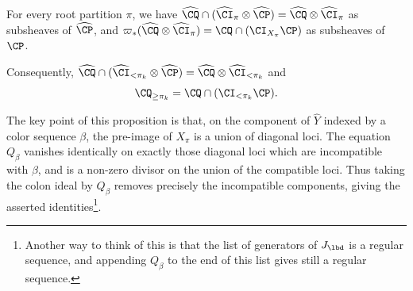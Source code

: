 \documentclass[11pt,reqno]{amsart}
\begin{document}
\begin{proposition}\label{prop:Q as cap}
For every root partition $\pi$, we have $\widehat{\CQ}\cap(\widehat{\CI}_\pi\otimes\widehat{\CP})=\widehat{\CQ}\otimes\widehat{\CI}_\pi$ as subsheaves of $\widehat{\CP}$, and $\varpi_*(\widehat{\CQ}\otimes\widehat{\CI}_\pi)=\CQ\cap(\CI_{X_\pi}\CP)$ as subsheaves of $\CP$. 

Consequently, $\widehat{\CQ}\cap(\widehat{\CI}_{<\pi_k}\otimes\widehat{\CP})=\widehat{\CQ}\otimes\widehat{\CI}_{<\pi_k}$
and $$\CQ_{\ge\pi_k}=\CQ\cap(\CI_{<\pi_k}\CP).$$
\end{proposition}
The key point of this proposition is that, on the component of $\widehat Y$ indexed by a color sequence $\beta$, the pre-image of $X_\pi$ is a union of diagonal loci. The equation $Q_\beta$ vanishes identically on exactly those diagonal loci which are incompatible with $\beta$, and is a non-zero divisor on the union of the compatible loci. Thus taking the colon ideal by $Q_\beta$ removes precisely the incompatible components, giving the asserted identities\footnote{Another way to think of this is that the list of generators of $J_\lbd$ is a regular sequence, and appending $Q_\beta$ to the end of this list gives still a regular sequence.}.
\end{document}
